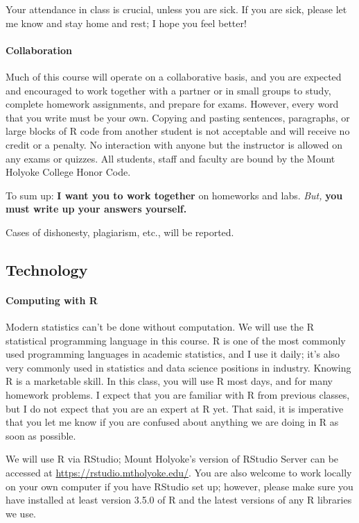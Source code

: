 \documentclass[11pt]{article}
\begin{document}
	Your attendance in class is crucial, unless you are sick.  If you are sick, please let me know and stay home and rest; I hope you feel better!
	
	\paragraph{Collaboration}
	
	Much of this course will operate on a collaborative basis, and you are expected and encouraged to work together with a partner or in small groups to study, complete homework assignments, and prepare for exams. However, every word that you write must be your own.  Copying and pasting sentences, paragraphs, or large blocks of R code from another student is not acceptable and will receive no credit or a penalty.  No interaction with anyone but the instructor is allowed on any exams or quizzes.  All students, staff and faculty are bound by the Mount Holyoke College Honor Code.
	
	To sum up: \textbf{I want you to work together} on homeworks and labs.  \emph{But,} \textbf{you must write up your answers yourself.}
	
	Cases of dishonesty, plagiarism, etc., will be reported.
	
	\subsection*{Technology}
	
	\paragraph{Computing with R}
	
	Modern statistics can't be done without computation.  We will use the R statistical programming language in this course.  R is one of the most commonly used programming languages in academic statistics, and I use it daily; it's also very commonly used in statistics and data science positions in industry.  Knowing R is a marketable skill.  In this class, you will use R most days, and for many homework problems.  I expect that you are familiar with R from previous classes, but I do not expect that you are an expert at R yet.  That said, it is imperative that you let me know if you are confused about anything we are doing in R as soon as possible.
	
	We will use R via RStudio; Mount Holyoke's version of RStudio Server can be accessed at \url{https://rstudio.mtholyoke.edu/}.  You are also welcome to work locally on your own computer if you have RStudio set up; however, please make sure you have installed at least version 3.5.0 of R and the latest versions of any R libraries we use.
	
\end{document}
